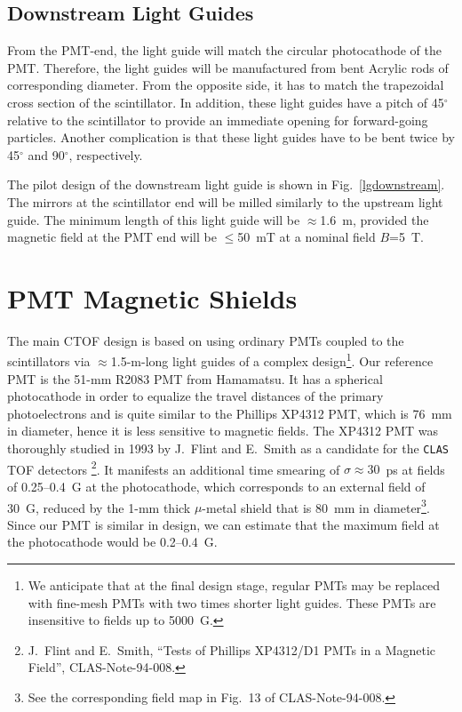\subsection{Downstream Light Guides}

From the PMT-end, the light guide will match the circular photocathode of 
the PMT.  Therefore, the light guides will be manufactured from bent Acrylic 
rods of corresponding diameter.  From the opposite side, it has to match the 
trapezoidal cross section of the scintillator.  In addition, these light 
guides have a pitch of 45$^\circ$ relative to the scintillator to provide an 
immediate opening for forward-going particles.  Another complication is that 
these light guides have to be bent twice by 45$^\circ$ and 90$^\circ$, 
respectively.
 
The pilot design of the downstream light guide is shown in Fig.~\ref{lgdownstream}. 
The mirrors at the scintillator end will be milled similarly to the upstream 
light guide.  The minimum length of this light guide will be $\approx$1.6~m, 
provided the magnetic field at the PMT end will be $\le$50~mT at a nominal 
field $B$=5~T.

\section{PMT Magnetic Shields}
 
The main CTOF design is based on using ordinary PMTs coupled to the 
scintillators via $\approx$1.5-m-long light guides of a complex 
design\footnote{We anticipate that at the final design stage, regular 
PMTs may be replaced with fine-mesh PMTs with two times shorter light 
guides.  These PMTs are insensitive to fields up to 5000~G.}.  Our reference  
PMT is the 51-mm R2083 PMT from Hamamatsu.  It has a spherical photocathode 
in order to equalize the travel distances of the primary photoelectrons and 
is quite similar to the Phillips XP4312 PMT, which is 76~mm in diameter, hence 
it is less sensitive to magnetic fields.  The XP4312 PMT was thoroughly studied 
in 1993 by J.~Flint and E.~Smith as a candidate for the {\tt CLAS} TOF detectors
\footnote{J.~Flint and E.~Smith, ``Tests of Phillips XP4312/D1 PMTs in a Magnetic 
Field'', CLAS-Note-94-008.}.  It manifests an additional time smearing of 
$\sigma \approx 30$~ps at fields of 0.25--0.4~G at the photocathode, which 
corresponds to an external field of 30~G, reduced by the 1-mm thick $\mu$-metal 
shield that is 80~mm in diameter\footnote{See the corresponding field map in Fig.~13 
of CLAS-Note-94-008.}.  Since our PMT is similar in design, we can estimate that
the maximum field at the photocathode would be 0.2--0.4~G.

